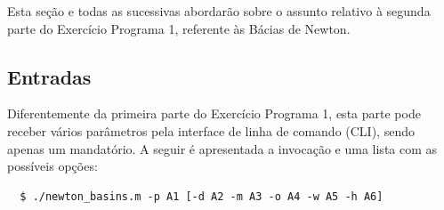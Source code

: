 \documentclass[11pt]{article}
\begin{document}
\indent\indent Esta seção e todas as sucessivas abordarão sobre o assunto relativo à segunda parte do Exercício Programa 1, referente às Bácias de Newton.

\subsection{Entradas}

\indent\indent Diferentemente da primeira parte do Exercício Programa 1, esta parte pode receber vários parâmetros pela interface de linha de comando (CLI), sendo
apenas um mandatório. A seguir é apresentada a invocação e uma lista com as possíveis opções:

\begin{verbatim}
  $ ./newton_basins.m -p A1 [-d A2 -m A3 -o A4 -w A5 -h A6]
\end{verbatim}
\end{document}

